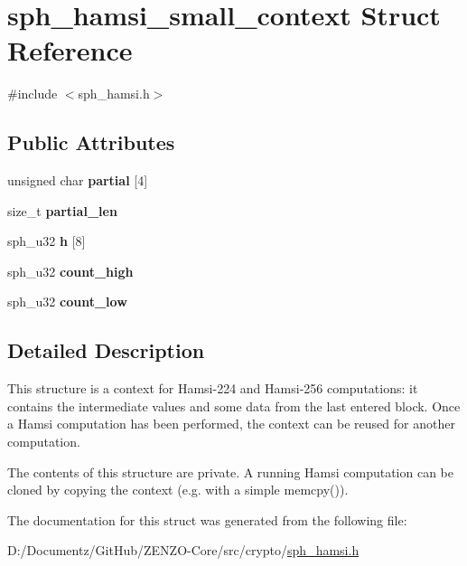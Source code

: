 \hypertarget{structsph__hamsi__small__context}{}\section{sph\+\_\+hamsi\+\_\+small\+\_\+context Struct Reference}
\label{structsph__hamsi__small__context}


{\ttfamily \#include $<$sph\+\_\+hamsi.\+h$>$}

\subsection*{Public Attributes}
\begin{DoxyCompactItemize}
\item 
\mbox{\label{structsph__hamsi__small__context_a1bd2d1a14623f0d028b8e29b8b91ef78}} 
unsigned char {\bfseries partial} \mbox{[}4\mbox{]}
\item 
\mbox{\label{structsph__hamsi__small__context_aa0df5e4f1b7d114db5f437a9fa2b8a57}} 
size\+\_\+t {\bfseries partial\+\_\+len}
\item 
\mbox{\label{structsph__hamsi__small__context_a27c6770512d8de7ba4f1dc26343faa28}} 
sph\+\_\+u32 {\bfseries h} \mbox{[}8\mbox{]}
\item 
\mbox{\label{structsph__hamsi__small__context_abde38ff81d5fcde44a2da6a33a19c828}} 
sph\+\_\+u32 {\bfseries count\+\_\+high}
\item 
\mbox{\label{structsph__hamsi__small__context_a88841f3fbb3203230a1834a5e0a8173c}} 
sph\+\_\+u32 {\bfseries count\+\_\+low}
\end{DoxyCompactItemize}


\subsection{Detailed Description}
This structure is a context for Hamsi-\/224 and Hamsi-\/256 computations\+: it contains the intermediate values and some data from the last entered block. Once a Hamsi computation has been performed, the context can be reused for another computation.

The contents of this structure are private. A running Hamsi computation can be cloned by copying the context (e.\+g. with a simple {\ttfamily memcpy()}). 

The documentation for this struct was generated from the following file\+:\begin{DoxyCompactItemize}
\item 
D\+:/\+Documentz/\+Git\+Hub/\+Z\+E\+N\+Z\+O-\/\+Core/src/crypto/\mbox{\hyperlink{sph__hamsi_8h}{sph\+\_\+hamsi.\+h}}\end{DoxyCompactItemize}
